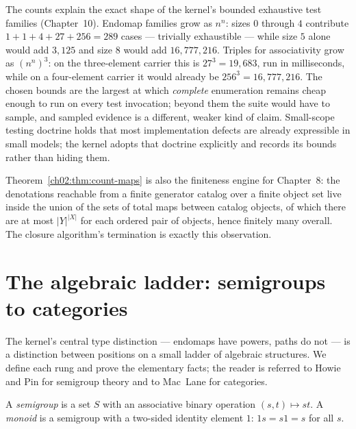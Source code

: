 \begin{remark}\label{ch02:rem:exhaustibility}
The counts explain the exact shape of the kernel's bounded exhaustive
test families (Chapter~10). Endomap families grow as $n^n$: sizes
$0$ through $4$ contribute $1 + 1 + 4 + 27 + 256 = 289$ cases ---
trivially exhaustible --- while size $5$ alone would add $3{,}125$ and
size $8$ would add $16{,}777{,}216$. Triples for associativity grow as
$(n^n)^3$: on the three-element carrier this is $27^3 = 19{,}683$, run
in milliseconds, while on a four-element carrier it would already be
$256^3 = 16{,}777{,}216$. The chosen bounds are the largest at which
\emph{complete} enumeration remains cheap enough to run on every test
invocation; beyond them the suite would have to sample, and sampled
evidence is a different, weaker kind of claim. Small-scope testing
doctrine \cite{jackson} holds that most implementation defects are
already expressible in small models; the kernel adopts that doctrine
explicitly and records its bounds rather than hiding them.
\end{remark}

\begin{remark}\label{ch02:rem:closure-finite}
Theorem~\ref{ch02:thm:count-maps} is also the finiteness engine for
Chapter~8: the denotations reachable from a finite generator catalog over a
finite object set live inside the union of the sets of total maps between
catalog objects, of which there are at most $|Y|^{|X|}$ for each ordered
pair of objects, hence finitely many overall. The closure algorithm's
termination is exactly this observation.
\end{remark}

\section{The algebraic ladder: semigroups to categories}\label{ch02:sec:ladder}

The kernel's central type distinction --- endomaps have powers, paths do not
--- is a distinction between positions on a small ladder of algebraic
structures. We define each rung and prove the elementary facts; the reader
is referred to Howie \cite{howie} and Pin \cite{pin} for semigroup theory
and to Mac~Lane \cite{maclanecwm} for categories.

\begin{definition}\label{ch02:def:semigroup}
A \emph{semigroup} is a set $S$ with an associative binary operation
$(s, t) \mapsto st$. A \emph{monoid} is a semigroup with a two-sided
identity element $1$: $1s = s1 = s$ for all $s$.
\end{definition}

